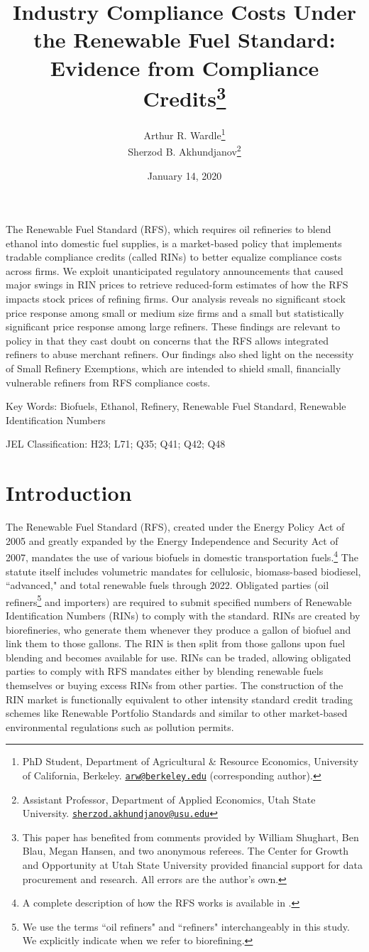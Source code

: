 \documentclass[11pt]{article}
\title{{\Large \bf Industry Compliance Costs Under the Renewable Fuel Standard: Evidence from Compliance Credits\thanks{This paper has benefited from comments provided by William Shughart, Ben Blau, Megan Hansen, and two anonymous referees. The Center for Growth and Opportunity at Utah State University provided financial support for data procurement and research. All errors are the author's own.}}}
\author{Arthur R. Wardle\footnote{
PhD Student, Department of Agricultural \& Resource Economics, University of California, Berkeley. \href{mailto:arw@berkeley.edu}{\tt arw@berkeley.edu} (corresponding author).}\\
Sherzod B. Akhundjanov\footnote{Assistant Professor, Department of Applied Economics, Utah State University. \href{matilto:sherzod.akhundjanov@usu.edu}{\tt sherzod.akhundjanov@usu.edu}}}
\date{January 14, 2020}
\begin{document}
\maketitle

The Renewable Fuel Standard (RFS), which requires oil refineries to blend ethanol into domestic fuel supplies, is a market-based policy that implements tradable compliance credits (called RINs) to better equalize compliance costs across firms. We exploit unanticipated regulatory announcements that caused major swings in RIN prices to retrieve reduced-form estimates of how the RFS impacts stock prices of refining firms. Our analysis reveals no significant stock price response among small or medium size firms and a small but statistically significant price response among large refiners. These findings are relevant to policy in that they cast doubt on concerns that the RFS allows integrated refiners to abuse merchant refiners. Our findings also shed light on the necessity of Small Refinery Exemptions, which are intended to shield small, financially vulnerable refiners from RFS compliance costs.
\newline

{\small
Key Words: Biofuels, Ethanol, Refinery, Renewable Fuel Standard, Renewable Identification Numbers

JEL Classification: H23; L71; Q35; Q41; Q42; Q48}
\newpage

\section{Introduction}

The Renewable Fuel Standard (RFS), created under the Energy Policy Act of 2005 and greatly expanded by the Energy Independence and Security Act of 2007, mandates the use of various biofuels in domestic transportation fuels.\footnote{A complete description of how the RFS works is available in \cite{Schnepf2013}.} The statute itself includes volumetric mandates for cellulosic, biomass-based biodiesel, ``advanced," and total renewable fuels through 2022. Obligated parties (oil refiners\footnote{We use the terms  ``oil refiners" and ``refiners" interchangeably in this study. We explicitly indicate when we refer to biorefining.} and importers) are required to submit specified numbers of Renewable Identification Numbers (RINs) to comply with the standard. RINs are created by biorefineries, who generate them whenever they produce a gallon of biofuel and link them to those gallons. The RIN is then split from those gallons upon fuel blending and becomes available for use. RINs can be traded, allowing obligated parties to comply with RFS mandates either by blending renewable fuels themselves or buying excess RINs from other parties. The construction of the RIN market is functionally equivalent to other intensity standard credit trading schemes like Renewable Portfolio Standards and similar to other market-based environmental regulations such as pollution permits. 
\end{document}
